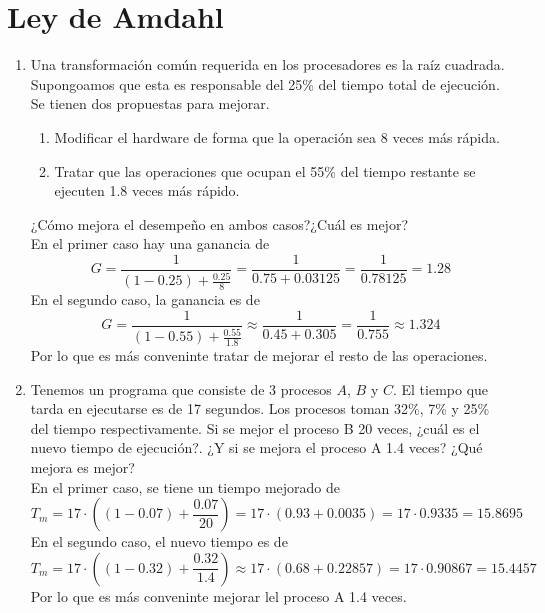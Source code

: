 \documentclass[]{article}
\begin{document}
    \section{
        Ley de Amdahl
    }

    \begin{enumerate}
        \item {
            Una transformación común requerida en los procesadores es la 
            raíz cuadrada. Supongoamos que esta es responsable del 25\% del 
            tiempo total de ejecución. Se tienen dos propuestas para mejorar.
            \begin{enumerate}
                \item {
                    Modificar el hardware de forma que la operación sea 8 
                    veces más rápida.
                }
                \item {
                    Tratar que las operaciones que ocupan el 55\% del 
                    tiempo restante se ejecuten 1.8 veces más rápido.
                }
            \end{enumerate}
            ¿Cómo mejora el desempeño en ambos casos?¿Cuál es mejor? \\
            En el primer caso hay una ganancia de 
            \[G = \frac{1}{(1-0.25) + \frac{0.25}{8}} = \frac{1}{0.75 + 0.03125} 
            = \frac{1}{0.78125} = 1.28\]
            En el segundo caso, la ganancia es de 
            \[G = \frac{1}{(1-0.55) + \frac{0.55}{1.8}} \approx \frac{1}{0.45 + 0.305} 
            = \frac{1}{0.755} \approx 1.324\]
            Por lo que es más conveninte tratar de mejorar el resto de las 
            operaciones.
        }
        \item {
            Tenemos un programa que consiste de 3 procesos $A$, $B$ y $C$. El 
            tiempo que tarda en ejecutarse es de 17 segundos. Los procesos toman
            32\%, 7\% y 25\% del tiempo respectivamente. Si se mejor el proceso
            B 20 veces, ¿cuál es el nuevo tiempo de ejecución?. ¿Y si se mejora
            el proceso A 1.4 veces? ¿Qué mejora es mejor?\\
            En el primer caso, se tiene un tiempo mejorado de 
            \[T_{m} = 17 \cdot ((1-0.07) + \frac{0.07}{20}) 
            = 17 \cdot (0.93 + 0.0035) = 17 \cdot 0.9335 = 15.8695\]
            En el segundo caso, el nuevo tiempo es de 
            \[T_{m} = 17 \cdot ((1-0.32) + \frac{0.32}{1.4}) 
            \approx 17 \cdot (0.68 + 0.22857) = 17 \cdot 0.90867 = 15.4457\]
            Por lo que es más conveninte mejorar lel proceso A 1.4 veces.
}
\end{enumerate}
\end{document}
